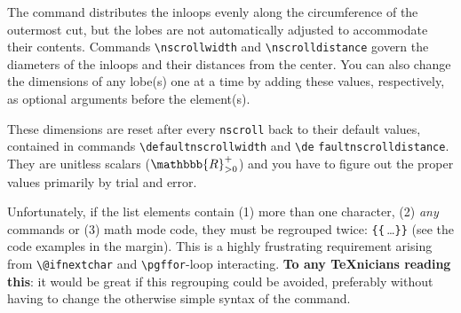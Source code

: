 \documentclass[a4paper,justified]{tufte-handout}
\begin{document}
The command distributes the inloops evenly along the circumference of the outermost cut, but the lobes are not automatically adjusted to accommodate their contents. Commands \verb|\nscrollwidth| and \verb|\nscrolldistance| govern the diameters of the inloops and their distances from the center. You can also change the dimensions of any lobe(s) one at a time by adding these values, respectively, as optional arguments before the element(s).

These dimensions are reset after every \verb|nscroll| back to their default values, contained in commands \verb|\defaultnscrollwidth| and \verb|\de| \verb|faultnscrolldistance|. They are unitless scalars ($\mathbbb{R}^{+}_{>0}$) and you have to figure out the proper values primarily by trial and error.

Unfortunately,\label{nscrolldbldelim} if the list elements contain (1) more than one character, (2) \textit{any} commands or (3) math mode code, they must be regrouped twice: \verb|{{|\,\dots\verb|}}| (see the code examples in the margin). This is a highly frustrating requirement arising from \verb|\@ifnextchar| and \verb|\pgffor|-loop interacting. \textbf{To any \TeX nicians reading this}: it would be great if this regrouping could be avoided, preferably without having to change the otherwise simple syntax of the command.
\end{document}
